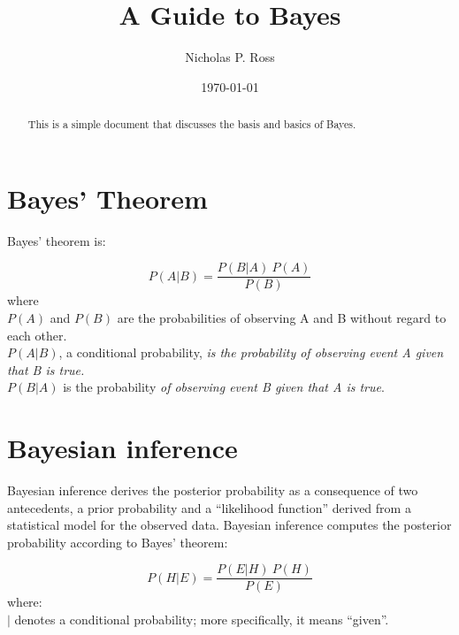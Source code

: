 \documentclass[11pt]{article}
\begin{document}
\title{A Guide to Bayes}
\author{Nicholas P. Ross}
\date{\today}
\maketitle


\begin{abstract}
This is a simple document that discusses the basis and basics of Bayes. 
\end{abstract}


\tableofcontents


\newpage
\section{Bayes' Theorem}

Bayes' theorem is:

\begin{equation} 
P(A|B) = \frac{ P(B|A)  \:   P(A)}  {P(B)}
\end{equation}
where\\

\noindent
$P(A)$ and $P(B)$ are the probabilities of observing A and B without regard to each other.\\

\noindent
$P(A | B)$, a conditional probability, {\it is the probability of observing event A given that B is true.}\\

\noindent
$P(B | A)$ is the probability {\it of observing event B given that A is true}.\\




\newpage
\section{Bayesian inference}

Bayesian inference derives the posterior probability as a consequence
of two antecedents, a prior probability and a ``likelihood function''
derived from a statistical model for the observed data. Bayesian
inference computes the posterior probability according to Bayes'
theorem:

\begin{equation} 
P(H|E) = \frac{ P(E|H)  \:   P(H)}  {P(E)}
\end{equation}
where:\\

\noindent
$|$ denotes a conditional probability; more specifically, it means
``given''.\\
\end{document}
